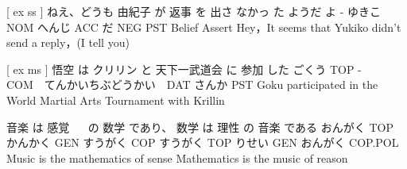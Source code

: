[ ex ss ]
ねえ、どうも 由紀子 が  返事   を  出さ なかっ た ようだ  よ
-           ゆきこ NOM へんじ ACC  だ   NEG  PST Belief Assert
Hey，It seems that Yukiko didn't send a reply，(I tell you)

[ ex ms ]
悟空   は  クリリン と    天下一武道会         に   参加 した
ごくう TOP -　　　　COM　てんかいちぶどうかい　DAT さんか PST
Goku participated in the World Martial Arts Tournament with Krillin

音楽    は   感覚 　 の   数学  であり、 数学    は  理性   の  音楽  である
おんがく TOP かんかく GEN すうがく COP すうがく TOP りせい GEN おんがく COP.POL
Music is the mathematics of sense
Mathematics is the music of reason
